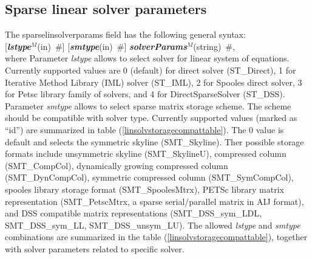 \documentclass[draft]{article}
\newcommand{\param}[1]{{\em #1}}
\newcommand{\keywordnotype}[1]{\mbox{{\it{\bf{#1}}}}}
\newcommand{\keyword}[2]{\mbox{{\keywordnotype{#1}\tiny (#2)}}}
\newcommand{\field}[2]{\mbox{\keyword{#1}{#2}~\#}}
\newcommand{\optField}[2]{\mbox{[\field{#1}{#2}]}}
\begin{document}
\subsection{Sparse linear solver parameters}
\label{sparselinsolver}
The sparselinsolverparams field has the following general syntax:\\
\optField{lstype$^M$}{in} \optField{smtype}{in} \field{solverParams$^M$}{string},\\
where 
Parameter \param{lstype} allows to select solver for linear system of
equations. Currently supported values are 0 (default) for direct solver
(ST\_Direct), 1 for Iterative Method Library (IML) solver (ST\_IML), 
2 for Spooles direct solver, 3 for Petsc
library family of solvers, and 4 for DirectSparseSolver (ST\_DSS).
Parameter \param{smtype} allows to select sparse matrix storage
scheme. The scheme should be compatible with solver type.
Currently supported values (marked as ``id'') are summarized in table
(\ref{linsolvstoragecompattable}). The 0 value is default and selects
the symmetric skyline (SMT\_Skyline). Ther possible storage formats
include unsymmetric skyline (SMT\_SkylineU), 
compressed column (SMT\_CompCol), dynamically growing compressed
column (SMT\_DynCompCol), symmetric compressed column
(SMT\_SymCompCol), spooles library storage format (SMT\_SpoolesMtrx),
PETSc library matrix representation (SMT\_PetscMtrx, a sparse
serial/parallel matrix in AIJ format), and DSS compatible matrix
representations (SMT\_DSS\_sym\_LDL, SMT\_DSS\_sym\_LL, SMT\_DSS\_unsym\_LU).
The allowed \param{lstype} and \param{smtype} combinations are
summarized in the table (\ref{linsolvstoragecompattable}), together
with solver parameters related to specific solver.
\end{document}

